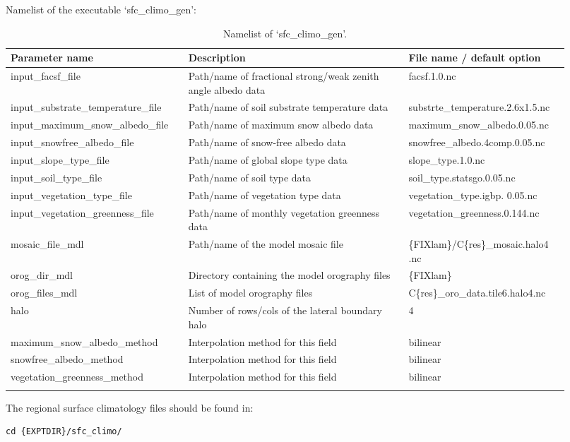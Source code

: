 \documentclass[11pt,fleqn]{report}              %
\begin{document}
Namelist of the executable `sfc\_climo\_gen':
{
\fontsize{9}{11}\selectfont
\begin{longtable}{ p{0.28\linewidth} | p{0.37\linewidth} | p{0.27\linewidth} }
\hline
\hline
 Parameter name & Description & File name / default option \\
\hline
 input\_facsf\_file & Path/name of fractional strong/weak zenith angle albedo data & facsf.1.0.nc \\
 input\_substrate\_temperature\_file & Path/name of soil substrate temperature data & substrte\_temperature.2.6x1.5.nc \\
 input\_maximum\_snow\_albedo\_file & Path/name of maximum snow albedo data & maximum\_snow\_albedo.0.05.nc \\
 input\_snowfree\_albedo\_file & Path/name of snow-free albedo data & snowfree\_albedo.4comp.0.05.nc \\
 input\_slope\_type\_file & Path/name of global slope type data & slope\_type.1.0.nc \\
 input\_soil\_type\_file & Path/name of soil type data & soil\_type.statsgo.0.05.nc \\
 input\_vegetation\_type\_file & Path/name of vegetation type data & vegetation\_type.igbp. 0.05.nc \\
 input\_vegetation\_greenness\_file & Path/name of monthly vegetation greenness data & vegetation\_greenness.0.144.nc \\
 mosaic\_file\_mdl & Path/name of the model mosaic file & \{FIXlam\}/C\{res\}\_mosaic.halo4 .nc \\
 orog\_dir\_mdl & Directory containing the model orography files & \{FIXlam\} \\
 orog\_files\_mdl & List of model orography files & C\{res\}\_oro\_data.tile6.halo4.nc \\
 halo & Number of rows/cols of the lateral boundary halo & 4 \\
 maximum\_snow\_albedo\_method & Interpolation method for this field  & bilinear \\
 snowfree\_albedo\_method & Interpolation method for this field  & bilinear \\
 vegetation\_greenness\_method &  Interpolation method for this field   & bilinear \\
\hline
\caption{Namelist of `sfc\_climo\_gen'.}
\label{table:namelist_sfc_climo_gen}
\end{longtable}
}

The regional surface climatology files should be found in:
\lstset{language=bash}   
\begin{lstlisting}[frame=trBL]
cd {EXPTDIR}/sfc_climo/
\end{lstlisting}
\end{document}
